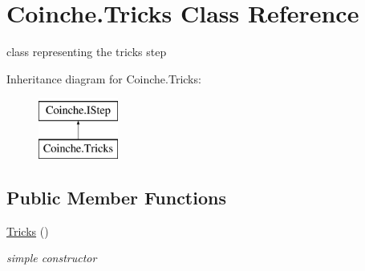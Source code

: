\hypertarget{class_coinche_1_1_tricks}{}\section{Coinche.\+Tricks Class Reference}
\label{class_coinche_1_1_tricks}


class representing the tricks step  


Inheritance diagram for Coinche.\+Tricks\+:\begin{figure}[H]
\begin{center}
\leavevmode
\includegraphics[height=2.000000cm]{class_coinche_1_1_tricks}
\end{center}
\end{figure}
\subsection*{Public Member Functions}
\begin{DoxyCompactItemize}
\item 
\hyperlink{class_coinche_1_1_tricks_afba8d7dcb751a3dde112f7f702399d00}{Tricks} ()
\begin{DoxyCompactList}\small\item\em simple constructor \end{DoxyCompactList}\end{DoxyCompactItemize}
